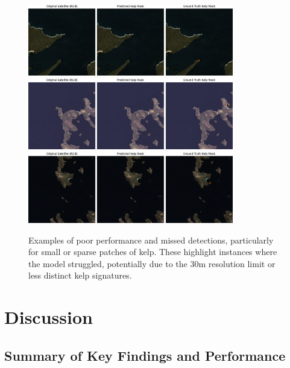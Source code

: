 \documentclass{article}
\begin{document}
\begin{figure}[htbp]
    \centering
    \includegraphics[width=0.8\textwidth]{bad1.png} %
    \includegraphics[width=0.8\textwidth]{bad2.png}
    \includegraphics[width=0.8\textwidth]{bad3.png}
    \caption{Examples of poor performance and missed detections, particularly for small or sparse patches of kelp. These highlight instances where the model struggled, potentially due to the 30m resolution limit or less distinct kelp signatures.}
    \label{fig:poor_segmentation}
\end{figure}

\section{Discussion}

\subsection{Summary of Key Findings and Performance}
\end{document}
